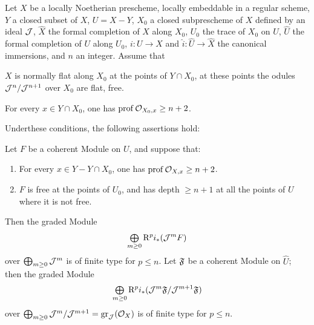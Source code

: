 \begin{theoreme} \label{XII.4.1} Let $X$ be a locally Noetherian prescheme, locally embeddable in a regular scheme, $Y$ a closed subset of $X$, $U=X- Y$, $X_0$ a closed subprescheme of $X$ defined by an ideal $\mathcal J$, $\widehat{X}$ the formal completion of $X$ along $X_0$, $U_0$ the trace of $X_0$ on $U$, $\widehat{U}$ the formal completion of $U$ along $U_0$, $i:U\to X$ and $\widehat{i}:\widehat{U}\to \widehat{X}$ the canonical immersions, and $n$ an integer. Assume that
\begin{enumeratea}
\item
$X$ is normally flat along $X_0$ at the points of $Y\cap X_0$, \ie at these points the odules $\mathcal J^n/\mathcal J^{n+1}$ over $X_0$ are flat, \ie {} free.
\item
For every $x\in Y\cap X_0$, one has $\operatorname{prof} \mathcal O_{X_0, x}\geq n+2$.
\end{enumeratea}
Under\pageoriginale these conditions, the following assertions hold:
\begin{enumerate}
\sisi{\item[$1^\circ)$]}{\item} Let $F$ be a coherent Module on $U$, and suppose that:
\begin{enumerate}
\item[\textup{c)}] For every $x\in Y- Y\cap X_0$, one has $\operatorname{prof} \mathcal O_{X, x}\geq n+2$.

\item[\textup{d)}] $F$ is free at the points of $U_0$, and has depth $\geq n+1$ at all the points of $U$ where it is not free.
\end{enumerate}
Then the graded Module
\[
\mathop{\textstyle\bigoplus}\limits_{m\geq 0}\mathrm R^pi_\ast(\mathcal J^mF)
\]
over $\bigoplus_{m\geq 0}\mathcal J^m$ is of finite type for $p\leq n$. \sisi{\item[$2^\circ$]}{\item} Let $\mathfrak F$ be a coherent Module on $\widehat{U}$; then the graded Module
\[
\mathop{\textstyle\bigoplus}\limits_{m\geq 0}\mathrm R^pi_\ast(\mathcal J^m\mathfrak F/\mathcal J^{m+1}\mathfrak F)
\]
over $\bigoplus_{m\geq 0}\mathcal J^m/\mathcal J^{m+1}=\operatorname{gr}_{\mathcal J}(\mathcal O_X)$ is of finite type for $p\leq n$.
\end{enumerate}
\end{theoreme}

